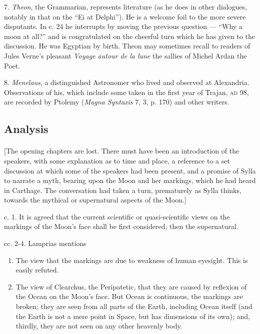 \documentclass[a4paper, 11pt, oneside, polutonikogreek, english]{article}
\begin{document}
7. \emph{Theon}, the Grammarian, represents literature (as he does in other dialogues, notably in that on the ``Ei at Delphi''). He is a welcome foil to the more severe disputants. In c. 24 he interrupts by moving the previous question --- ``Why a moon at all?'' and is congratulated on the cheerful turn which he has given to the discussion. He was Egyptian by birth. Theon may sometimes recall to readers of Jules Verne's pleasant \emph{Voyage autour de la lune} the sallies of Michel Ardan the Poet.

8. \emph{Menelaus}, a distinguished Astronomer who lived and observed at Alexandria. Observations of his, which include some taken in the first year of Trajan, \textsc{ad} 98, are recorded by Ptolemy (\emph{Magna Syntaxis} 7, 3, p. 170) and other writers.

\subsection*{Analysis}
\paragraph{}
[The opening chapters are lost. There must have been an introduction of the speakers, with some explanation as to time and place, a reference to a set discussion at which some of the speakers had been present, and a promise of Sylla to narrate a myth, bearing upon the Moon and her markings, which he had heard in Carthage. The conversation had taken a turn, prematurely as Sylla thinks, towards the mythical or supernatural aspects of the Moon.]

c. 1. It is agreed that the current scientific or quasi-scientific views on the markings of the Moon's face shall be first considered, then the supernatural.

cc. 2-4. Lamprias mentions
\begin{enumerate}
    \item The view that the markings are due to weakness of human eyesight. This is easily refuted.

    \item The view of Clearchus, the Peripatetic, that they are caused by reflexion of the Ocean on the Moon's face. But Ocean is continuous, the markings are broken; they are seen from all parts of the Earth, including Ocean itself (and the Earth is not a mere point in Space, but has dimensions of its own); and, thirdly, they are not seen on any other heavenly body.
\end{enumerate}
\end{document}
